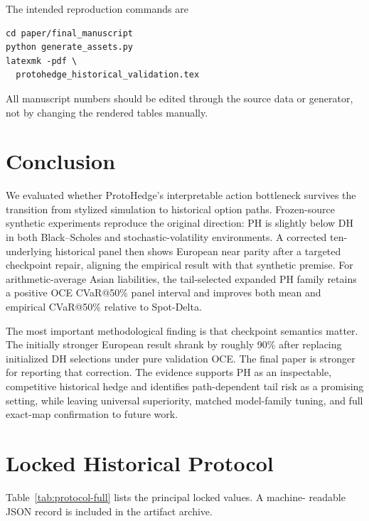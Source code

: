 \documentclass[conference]{IEEEtran}
\begin{document}
The intended reproduction commands are
\begin{verbatim}
cd paper/final_manuscript
python generate_assets.py
latexmk -pdf \
  protohedge_historical_validation.tex
\end{verbatim}
All manuscript numbers should be edited through the source data or generator,
not by changing the rendered tables manually.

\section{Conclusion}

We evaluated whether ProtoHedge's interpretable action bottleneck survives the
transition from stylized simulation to historical option paths. Frozen-source
synthetic experiments reproduce the original direction: PH is slightly below
DH in both Black--Scholes and stochastic-volatility environments. A corrected
ten-underlying historical panel then shows European near parity after a
targeted checkpoint repair, aligning the empirical result with that synthetic
premise. For arithmetic-average Asian liabilities, the tail-selected expanded
PH family retains a positive OCE CVaR@50\% panel interval and improves both mean
and empirical CVaR@50\% relative to Spot-Delta.

The most important methodological finding is that checkpoint semantics matter.
The initially stronger European result shrank by roughly 90\% after replacing
initialized DH selections under pure validation OCE. The final paper is
stronger for reporting that correction. The evidence supports PH as an
inspectable, competitive historical hedge and identifies path-dependent tail
risk as a promising setting, while leaving universal superiority, matched
model-family tuning, and full exact-map confirmation to future work.

\appendices

\section{Locked Historical Protocol}
\label{app:protocol}

Table~\ref{tab:protocol-full} lists the principal locked values. A machine-
readable JSON record is included in the artifact archive.

\begin{table}[h]
\centering
\small

\caption{Locked historical protocol. A null batch override means the runner's
implementation default was retained rather than retroactively assigning a
batch size.}
\label{tab:protocol-full}
\end{table}
\end{document}
